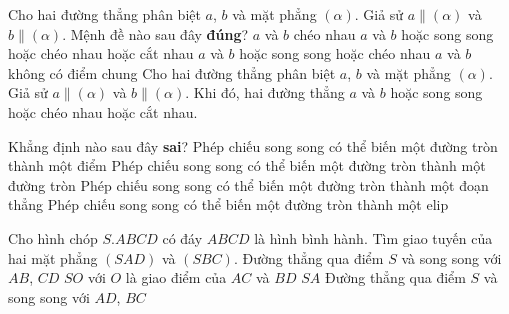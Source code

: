 \begin{ex}%
	Cho hai đường thẳng phân biệt $a$, $b$ và mặt phẳng $(\alpha)$. Giả sử $a \parallel (\alpha)$ và $b \parallel (\alpha)$. Mệnh đề nào sau đây \textbf{đúng}?
	\choice
	{$a$ và $b$ chéo nhau}
	{\True $a$ và $b$ hoặc song song hoặc chéo nhau hoặc cắt nhau}
	{$a$ và $b$ hoặc song song hoặc chéo nhau}
	{$a$ và $b$ không có điểm chung}
	\loigiai
	{
		Cho hai đường thẳng phân biệt $a$, $b$ và mặt phẳng $(\alpha)$. Giả sử $a\parallel (\alpha)$ và $b\parallel (\alpha)$. Khi đó, hai đường thẳng $a$ và $b$ hoặc song song hoặc chéo nhau hoặc cắt nhau.
	}
\end{ex}
\begin{ex}%
	Khẳng định nào sau đây \textbf{sai}?
	\choice
	{\True Phép chiếu song song có thể biến một đường tròn thành một điểm}
	{Phép chiếu song song có thể biến một đường tròn thành một đường tròn}
	{Phép chiếu song song có thể biến một đường tròn thành một đoạn thẳng}
	{Phép chiếu song song có thể biến một đường tròn thành một elip}
\end{ex}
\begin{ex}%
	Cho hình chóp $S.ABCD$ có đáy $ABCD$ là hình bình hành. Tìm giao tuyến của hai mặt phẳng $(SAD)$ và $(SBC)$.
	\choice
	{Đường thẳng qua điểm $S$ và song song với $AB$, $CD$}
	{$SO$ với $O$ là giao điểm của $AC$ và $BD$}
	{$SA$}
	{\True Đường thẳng qua điểm $S$ và song song với $AD$, $BC$}
\end{ex}
